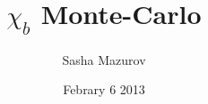 
\title[$\chi_b$ Monte-Carlo]{$\chi_b$ Monte-Carlo}
\author[A. Mazurov]
{Sasha Mazurov}

\date{Febrary 6 2013}
